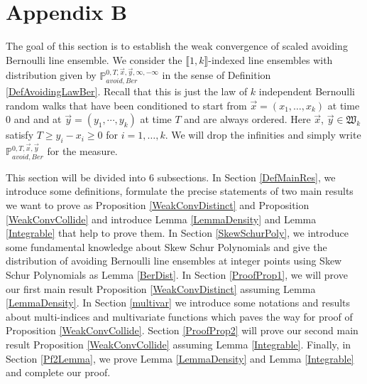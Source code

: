 %
\section{Appendix B} \label{Section9}

The goal of this section is to establish the weak convergence of scaled avoiding Bernoulli line ensemble. We consider the $\llbracket 1,k\rrbracket$-indexed line ensembles with distribution given by $\mathbb{P}^{0,T,\vec{x},\vec{y},\infty,-\infty}_{avoid,Ber}$ in the sense of Definition \ref{DefAvoidingLawBer}. Recall that this is just the law of $k$ independent Bernoulli random walks that have been conditioned to start from $\vec{x}=(x_{1},\dots,x_{k})$ at time $0$ and and at $\vec{y}=(y_1,\cdots,y_{k})$ at time $T$ and are always ordered. Here $\vec{x}$, $\vec{y}\in\mathfrak{W}_{k}$ satisfy $T\geq y_{i}-x_{i}\geq 0$ for $i=1,\dots,k$. We will drop the infinities and simply write $\mathbb{P}^{0,T,\vec{x},\vec{y}}_{avoid,Ber}$ for the measure.

This section will be divided into $6$ subsections. In Section \ref{DefMainRes}, we introduce some definitions, formulate the precise statements of two main results we want to prove as Proposition \ref{WeakConvDistinct} and Proposition \ref{WeakConvCollide} and introduce Lemma \ref{LemmaDensity} and Lemma \ref{Integrable} that help to prove them. In Section \ref{SkewSchurPoly}, we introduce some fundamental knowledge about Skew Schur Polynomials and give the distribution of avoiding Bernoulli line ensembles at integer points using Skew Schur Polynomials as Lemma \ref{BerDist}. In Section \ref{ProofProp1}, we will prove our first main result Proposition \ref{WeakConvDistinct} assuming Lemma \ref{LemmaDensity}. In Section \ref{multivar} we introduce some notations and results about multi-indices and multivariate functions which paves the way for proof of Proposition \ref{WeakConvCollide}. Section \ref{ProofProp2} will prove our second main result Proposition \ref{WeakConvCollide} assuming Lemma \ref{Integrable}. Finally, in Section \ref{Pf2Lemma}, we prove Lemma \ref{LemmaDensity} and Lemma \ref{Integrable} and complete our proof.

